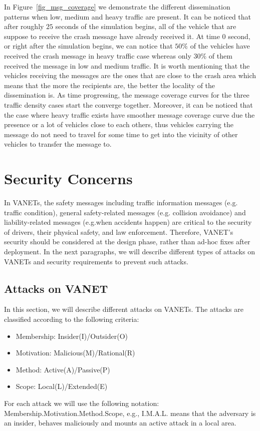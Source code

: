 \documentclass{IEEEtran}
\begin{document}
In Figure~\ref{fig_msg_coverage} we demonstrate the different dissemination patterns when low, medium and heavy traffic are present. It can be noticed that after roughly $25$ seconds of the simulation begins, all of the vehicle that are suppose to receive the crash message have already received it. At time $0$ second, or right after the simulation begins, we can notice that $50\%$ of the vehicles have received the crash message in heavy traffic case whereas only $30\%$ of them received the message in low and medium traffic. It is worth mentioning that the vehicles receiving the messages are the ones that are close to the crash area which means that the more the recipients are, the better the locality of the dissemination is. As time progressing, the message coverage curves for the three traffic density cases start the converge together. Moreover, it can be noticed that the case where heavy traffic exists have smoother message coverage curve due the presence or a lot of vehicles close to each others, thus vehicles carrying the message do not need to travel for some time to get into the vicinity of other vehicles to transfer the message to.




\section{Security Concerns}

In VANETs, the safety messages including traffic information messages (e.g. traffic condition), general safety-related messages (e.g. collision avoidance) and liability-related messages (e.g.when accidents happen) are critical to the security of drivers, their physical safety, and law enforcement. Therefore, VANET’s security should be considered at the design phase, rather than ad-hoc fixes after deployment. In the next paragraphs, we will describe different types of attacks on VANETs \cite{SecurityVANET, SecurityWSN} and security requirements to prevent such attacks.

\subsection{Attacks on VANET}

In this section, we will describe different attacks on VANETs. The attacks are classified according to the following criteria:
\begin{itemize}
\item Membership: Insider(I)/Outsider(O)
\item Motivation: Malicious(M)/Rational(R)
\item Method: Active(A)/Passive(P)
\item Scope: Local(L)/Extended(E)
\end{itemize}
For each attack we will use the following notation: Membership.Motivation.Method.Scope, e.g., I.M.A.L. means that the adversary is an insider, behaves maliciously and mounts an active attack in a local area.
\end{document}

